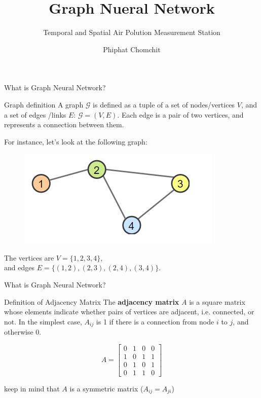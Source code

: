 \documentclass{beamer}
\title{Graph Nueral Network}
\subtitle{Temporal and Spatial Air Polution Measurement Station}
\author{Phiphat Chomchit}
\institute{CMU}
\date{}
\begin{document}
	\begin{frame}
		\titlepage
	\end{frame}

	\begin{frame}[t]{What is Graph Neural Network?}\vspace{10pt}
	 
		\begin{block}{Graph definition}
			A graph $\mathcal{G}$ is defined as a tuple of a set of nodes/vertices $V$, and a set of edges /links $E$: $\mathcal{G}=(V,E)$. Each edge is a pair of two vertices, and represents a connection between them. 
		\end{block}
		For instance, let's look at the following graph:
		\begin{figure}
			\centering
			\includegraphics[scale=0.5]{sg.png}
		\end{figure}
	
	The vertices are $V=\{1,2,3,4\}$,\\ and edges $E=\{(1,2), (2,3), (2,4), (3,4)\}$.
	\end{frame}
	
	\begin{frame}[t]{What is Graph Neural Network?}\vspace{4pt}
		\begin{block}{Definition of Adjacency Matrix}
			\vspace{0.5em}
			The \textbf{adjacency matrix} $A$ is a square matrix whose elements indicate whether pairs of vertices are adjacent, i.e. connected, or not. In the simplest case, $A_{ij}$ is 1 if there is a connection from node $i$ to $j$, and otherwise 0.
			\vspace{0.5em}
		\end{block}
		
		$$
		A = \begin{bmatrix}
		0 & 1 & 0 & 0\\
		1 & 0 & 1 & 1\\
		0 & 1 & 0 & 1\\
		0 & 1 & 1 & 0
		\end{bmatrix}
		$$
		
		keep in mind that $A$ is a symmetric matrix ($A_{ij}=A_{ji}$)
	\end{frame}
	
\end{document}
